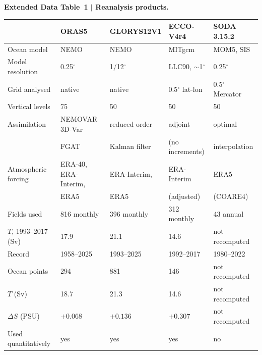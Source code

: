 \textbf{Extended Data Table~1 $\vert$ Reanalysis products.}

\begin{center}
\small
\begin{tabular}{lllll}
\toprule
 & ORAS5 & GLORYS12V1 & ECCO-V4r4 & SODA 3.15.2 \\
\midrule
Ocean model        & NEMO & NEMO & MITgcm & MOM5, SIS \\
Model resolution   & 0.25$^\circ$ & 1/12$^\circ$ & LLC90, $\sim$1$^\circ$ & 0.25$^\circ$ \\
Grid analysed      & native & native & 0.5$^\circ$ lat-lon & 0.5$^\circ$ Mercator \\
Vertical levels    & 75 & 50 & 50 & 50 \\
Assimilation       & NEMOVAR 3D-Var & reduced-order & adjoint & optimal \\
                   & FGAT           & Kalman filter & (no increments) & interpolation \\
Atmospheric forcing & ERA-40, ERA-Interim, & ERA-Interim, & ERA-Interim & ERA5 \\
                    & ERA5 & ERA5 & (adjusted) & (COARE4) \\
Fields used        & 816 monthly & 396 monthly & 312 monthly & 43 annual \\
$T$, 1993--2017 (Sv) & 17.9 & 21.1 & 14.6 & not recomputed \\
Record             & 1958--2025 & 1993--2025 & 1992--2017 & 1980--2022 \\
Ocean points       & 294 & 881 & 146 & not recomputed \\
$T$ (Sv)           & 18.7 & 21.3 & 14.6 & not recomputed \\
$\Delta S$ (PSU)   & $+0.068$ & $+0.136$ & $+0.307$ & not recomputed \\
Used quantitatively & yes & yes & yes & no \\
\bottomrule
\end{tabular}
\end{center}
